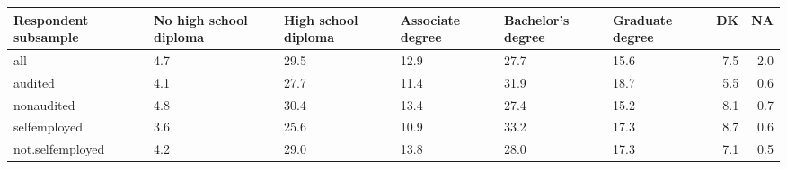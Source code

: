 \begin{table}[ht]
\centering
\begin{tabular}{lL{2cm}L{2cm}L{2cm}L{2cm}L{2cm}rr}
  \hline
Respondent subsample & No high school diploma & High school diploma & Associate degree & Bachelor's degree & Graduate degree & DK & NA \\ 
  \hline
all & 4.7 & 29.5 & 12.9 & 27.7 & 15.6 & 7.5 & 2.0 \\ 
  audited & 4.1 & 27.7 & 11.4 & 31.9 & 18.7 & 5.5 & 0.6 \\ 
  nonaudited & 4.8 & 30.4 & 13.4 & 27.4 & 15.2 & 8.1 & 0.7 \\ 
  selfemployed & 3.6 & 25.6 & 10.9 & 33.2 & 17.3 & 8.7 & 0.6 \\ 
  not.selfemployed & 4.2 & 29.0 & 13.8 & 28.0 & 17.3 & 7.1 & 0.5 \\ 
   \hline
\end{tabular}
\end{table}
